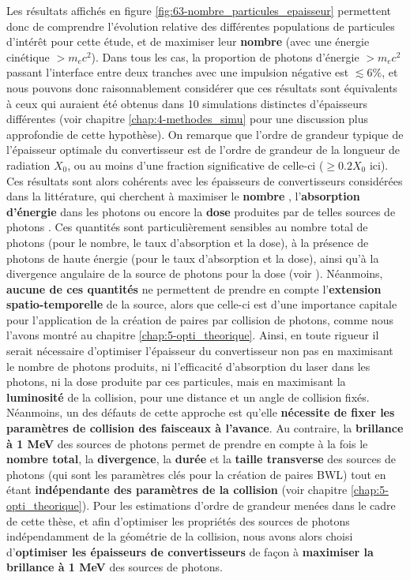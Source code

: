 \begin{refsection}
Les résultats affichés en figure \ref{fig:63-nombre_particules_epaisseur} permettent donc de comprendre l'évolution relative des différentes populations de particules d'intérêt pour cette étude, et de maximiser leur \textbf{nombre} (avec une énergie cinétique $> m_e c^2$). Dans tous les cas, la proportion de photons d'énergie $> m_e c^2$ passant l'interface entre deux tranches avec une impulsion négative est $\lesssim 6 \%$, et nous pouvons donc raisonnablement considérer que ces résultats sont équivalents à ceux qui auraient été obtenus dans 10 simulations distinctes d'épaisseurs différentes (voir chapitre \ref{chap:4-methodes_simu} pour une discussion plus approfondie de cette hypothèse). On remarque que l'ordre de grandeur typique de l'épaisseur optimale du convertisseur est de l'ordre de grandeur de la longueur de radiation $X_0$, ou au moins d'une fraction significative de celle-ci ($\ge 0.2 X_0$ ici). Ces résultats sont alors cohérents avec les épaisseurs de convertisseurs considérées dans la littérature, qui cherchent à maximiser le \textbf{nombre} \parencite{lobok_2019}, l'\textbf{absorption d'énergie} dans les photons \parencite{jiang_2014, lobok_2019} ou encore la \textbf{dose} produites par de telles sources de photons \parencite{yang_2017b, compantlafontaine_2014}. Ces quantités sont particulièrement sensibles au nombre total de photons (pour le nombre, le taux d'absorption et la dose), à la présence de photons de haute énergie (pour le taux d'absorption et la dose), ainsi qu'à la divergence angulaire de la source de photons pour la dose (voir \parencite{compantlafontaine_2014}). Néanmoins, \textbf{aucune de ces quantités} ne permettent de prendre en compte l'\textbf{extension spatio-temporelle} de la source, alors que celle-ci est d'une importance capitale pour l'application de la création de paires par collision de photons, comme nous l'avons montré au chapitre \ref{chap:5-opti_theorique}. 
Ainsi, en toute rigueur il serait nécessaire d'optimiser l'épaisseur du convertisseur non pas en maximisant le nombre de photons produits, ni l'efficacité d'absorption du laser dans les photons, ni la dose produite par ces particules, mais en maximisant la \textbf{luminosité} de la collision, pour une distance et un angle de collision fixés. Néanmoins, un des défauts de cette approche est qu'elle \textbf{nécessite de fixer les paramètres de collision des faisceaux à l'avance}. Au contraire, la \textbf{brillance à 1 MeV} des sources de photons permet de prendre en compte à la fois le \textbf{nombre total}, la \textbf{divergence}, la \textbf{durée} et la \textbf{taille transverse} des sources de photons (qui sont les paramètres clés pour la création de paires BWL) tout en étant \textbf{indépendante des paramètres de la collision} (voir chapitre \ref{chap:5-opti_theorique}). Pour les estimations d'ordre de grandeur menées dans le cadre de cette thèse, et afin d'optimiser les propriétés des sources de photons indépendamment de la géométrie de la collision, nous avons alors choisi d'\textbf{optimiser les épaisseurs de convertisseurs} de façon à \textbf{maximiser la brillance à 1 MeV} des sources de photons.

\end{refsection}
